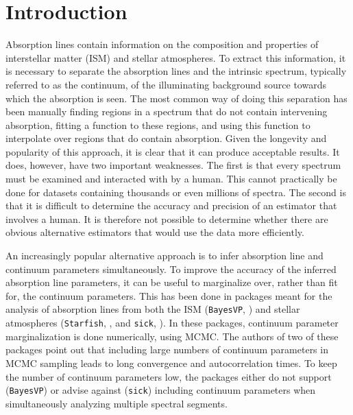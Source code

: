 \documentclass[manuscript]{aastex62}
\begin{document}
\section{Introduction}
\label{sec:introduction}
Absorption lines contain information on the composition and properties of interstellar matter (ISM) and stellar atmospheres.
To extract this information, it is necessary to separate the absorption lines and the intrinsic spectrum, typically referred to as the continuum, of the illuminating background source towards which the absorption is seen.
The most common way of doing this separation has been manually finding regions in a spectrum that do not contain intervening absorption, fitting a function to these regions, and using this function to interpolate over regions that do contain absorption.
Given the longevity and popularity of this approach, it is clear that it can produce acceptable results.
It does, however, have two important weaknesses.
The first is that every spectrum must be examined and interacted with by a human.
This cannot practically be done for datasets containing thousands or even millions of spectra.
The second is that it is difficult to determine the accuracy and precision of an estimator that involves a human.
It is therefore not possible to determine whether there are obvious alternative estimators that would use the data more efficiently.

An increasingly popular alternative approach is to infer absorption line and continuum parameters simultaneously.
To improve the accuracy of the inferred absorption line parameters, it can be useful to marginalize over, rather than fit for, the continuum parameters.
This has been done in packages meant for the analysis of absorption lines from both the ISM (\texttt{BayesVP}, \citealt{Liang:2018kq}) and stellar atmospheres (\texttt{Starfish}, \citealt{2015ApJ...812..128C}, and \texttt{sick}, \citealt{2016ApJS..223....8C}).
In these packages, continuum parameter marginalization is done numerically, using MCMC.
The authors of two of these packages point out that including large numbers of continuum parameters in MCMC sampling leads to long convergence and autocorrelation times.
To keep the number of continuum parameters low, the packages either do not support (\texttt{BayesVP}) or advise against (\texttt{sick}) including continuum parameters when simultaneously analyzing multiple spectral segments.
\end{document}
